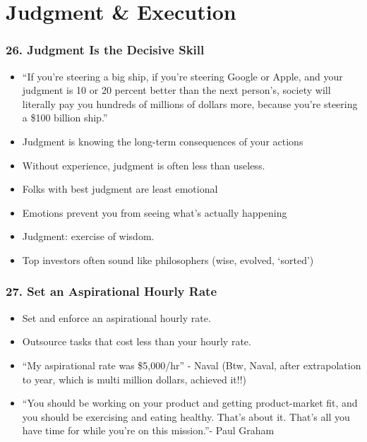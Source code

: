 \section{Judgment \& Execution}

\begin{frame}[fragile]
\frametitle{26. Judgment Is the Decisive Skill}
\begin{itemize}
\item ``If you're steering a big ship, if you're steering Google or Apple, and your judgment is 10 or 20 percent better than the next person's, society will literally pay you hundreds of millions of dollars more, because you're steering a \$100 billion ship.''
\item Judgment is knowing the long-term consequences of your actions
\item Without experience, judgment is often less than useless.
\item Folks with best judgment are least emotional
\item Emotions prevent you from seeing what's actually happening
\item Judgment: exercise of wisdom. 
\item Top investors often sound like philosophers (wise, evolved, `sorted')
\end{itemize}
\end{frame}

\begin{frame}[fragile]
\frametitle{27. Set an Aspirational Hourly Rate}
\begin{itemize}
\item Set and enforce an aspirational hourly rate.
\item Outsource tasks that cost less than your hourly rate.
\item ``My aspirational rate was \$5,000/hr'' - Naval (Btw, Naval, after extrapolation to year, which is multi million dollars, achieved it!!)
\item ``You should be working on your product and
getting product-market fit, and you should be exercising and eating healthy. That's about it. That's all you have time for while you're on this mission.''- Paul Graham
\end{itemize}
\end{frame}

